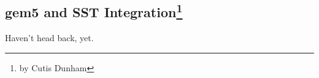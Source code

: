 \subsection[gem5 and SST Integration]{gem5 and SST Integration\footnote{by Cutis Dunham}}

Haven't head back, yet.
